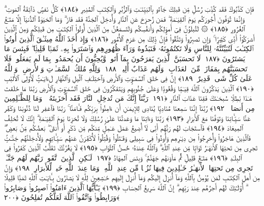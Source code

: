  فَإِن كَذَّبُوكَ فَقَد كُذِّبَ رُسُلٌۭ مِّن قَبلِكَ جَآءُو بِٱلبَيِّنَـٰتِ وَٱلزُّبُرِ وَٱلكِتَـٰبِ ٱلمُنِيرِ ﴿١٨٤﴾
 كُلُّ نَفسٍۢ ذَآئِقَةُ ٱلمَوتِ ۗ وَإِنَّمَا تُوَفَّونَ أُجُورَكُم يَومَ ٱلقِيَـٰمَةِ ۖ فَمَن زُحزِحَ عَنِ ٱلنَّارِ وَأُدخِلَ ٱلجَنَّةَ فَقَد فَازَ ۗ وَمَا ٱلحَيَوٰةُ ٱلدُّنيَآ إِلَّا مَتَـٰعُ ٱلغُرُورِ ﴿١٨٥﴾
 ۞ لَتُبلَوُنَّ فِىٓ أَموَٟلِكُم وَأَنفُسِكُم وَلَتَسمَعُنَّ مِنَ ٱلَّذِينَ أُوتُوا۟ ٱلكِتَـٰبَ مِن قَبلِكُم وَمِنَ ٱلَّذِينَ أَشرَكُوٓا۟ أَذًۭى كَثِيرًۭا ۚ وَإِن تَصبِرُوا۟ وَتَتَّقُوا۟ فَإِنَّ ذَٟلِكَ مِن عَزمِ ٱلأُمُورِ ﴿١٨٦﴾
 وَإِذ أَخَذَ ٱللَّهُ مِيثَـٰقَ ٱلَّذِينَ أُوتُوا۟ ٱلكِتَـٰبَ لَتُبَيِّنُنَّهُۥ لِلنَّاسِ وَلَا تَكتُمُونَهُۥ فَنَبَذُوهُ وَرَآءَ ظُهُورِهِم وَٱشتَرَوا۟ بِهِۦ ثَمَنًۭا قَلِيلًۭا ۖ فَبِئسَ مَا يَشتَرُونَ ﴿١٨٧﴾
 لَا تَحسَبَنَّ ٱلَّذِينَ يَفرَحُونَ بِمَآ أَتَوا۟ وَّيُحِبُّونَ أَن يُحمَدُوا۟ بِمَا لَم يَفعَلُوا۟ فَلَا تَحسَبَنَّهُم بِمَفَازَةٍۢ مِّنَ ٱلعَذَابِ ۖ وَلَهُم عَذَابٌ أَلِيمٌۭ ﴿١٨٨﴾
 وَلِلَّهِ مُلكُ ٱلسَّمَـٰوَٟتِ وَٱلأَرضِ ۗ وَٱللَّهُ عَلَىٰ كُلِّ شَىءٍۢ قَدِيرٌ ﴿١٨٩﴾
 إِنَّ فِى خَلقِ ٱلسَّمَـٰوَٟتِ وَٱلأَرضِ وَٱختِلَـٰفِ ٱلَّيلِ وَٱلنَّهَارِ لَءَايَـٰتٍۢ لِّأُو۟لِى ٱلأَلبَٰبِ ﴿١٩٠﴾
 ٱلَّذِينَ يَذكُرُونَ ٱللَّهَ قِيَـٰمًۭا وَقُعُودًۭا وَعَلَىٰ جُنُوبِهِم وَيَتَفَكَّرُونَ فِى خَلقِ ٱلسَّمَـٰوَٟتِ وَٱلأَرضِ رَبَّنَا مَا خَلَقتَ هَـٰذَا بَٰطِلًۭا سُبحَـٰنَكَ فَقِنَا عَذَابَ ٱلنَّارِ ﴿١٩١﴾
 رَبَّنَآ إِنَّكَ مَن تُدخِلِ ٱلنَّارَ فَقَد أَخزَيتَهُۥ ۖ وَمَا لِلظَّـٰلِمِينَ مِن أَنصَارٍۢ ﴿١٩٢﴾
 رَّبَّنَآ إِنَّنَا سَمِعنَا مُنَادِيًۭا يُنَادِى لِلإِيمَـٰنِ أَن ءَامِنُوا۟ بِرَبِّكُم فَـَٔامَنَّا ۚ رَبَّنَا فَٱغفِر لَنَا ذُنُوبَنَا وَكَفِّر عَنَّا سَيِّـَٔاتِنَا وَتَوَفَّنَا مَعَ ٱلأَبرَارِ ﴿١٩٣﴾
 رَبَّنَا وَءَاتِنَا مَا وَعَدتَّنَا عَلَىٰ رُسُلِكَ وَلَا تُخزِنَا يَومَ ٱلقِيَـٰمَةِ ۗ إِنَّكَ لَا تُخلِفُ ٱلمِيعَادَ ﴿١٩٤﴾
 فَٱستَجَابَ لَهُم رَبُّهُم أَنِّى لَآ أُضِيعُ عَمَلَ عَـٰمِلٍۢ مِّنكُم مِّن ذَكَرٍ أَو أُنثَىٰ ۖ بَعضُكُم مِّنۢ بَعضٍۢ ۖ فَٱلَّذِينَ هَاجَرُوا۟ وَأُخرِجُوا۟ مِن دِيَـٰرِهِم وَأُوذُوا۟ فِى سَبِيلِى وَقَـٰتَلُوا۟ وَقُتِلُوا۟ لَأُكَفِّرَنَّ عَنهُم سَيِّـَٔاتِهِم وَلَأُدخِلَنَّهُم جَنَّـٰتٍۢ تَجرِى مِن تَحتِهَا ٱلأَنهَـٰرُ ثَوَابًۭا مِّن عِندِ ٱللَّهِ ۗ وَٱللَّهُ عِندَهُۥ حُسنُ ٱلثَّوَابِ ﴿١٩٥﴾
 لَا يَغُرَّنَّكَ تَقَلُّبُ ٱلَّذِينَ كَفَرُوا۟ فِى ٱلبِلَـٰدِ ﴿١٩٦﴾
 مَتَـٰعٌۭ قَلِيلٌۭ ثُمَّ مَأوَىٰهُم جَهَنَّمُ ۚ وَبِئسَ ٱلمِهَادُ ﴿١٩٧﴾
 لَـٰكِنِ ٱلَّذِينَ ٱتَّقَوا۟ رَبَّهُم لَهُم جَنَّـٰتٌۭ تَجرِى مِن تَحتِهَا ٱلأَنهَـٰرُ خَـٰلِدِينَ فِيهَا نُزُلًۭا مِّن عِندِ ٱللَّهِ ۗ وَمَا عِندَ ٱللَّهِ خَيرٌۭ لِّلأَبرَارِ ﴿١٩٨﴾
 وَإِنَّ مِن أَهلِ ٱلكِتَـٰبِ لَمَن يُؤمِنُ بِٱللَّهِ وَمَآ أُنزِلَ إِلَيكُم وَمَآ أُنزِلَ إِلَيهِم خَـٰشِعِينَ لِلَّهِ لَا يَشتَرُونَ بِـَٔايَـٰتِ ٱللَّهِ ثَمَنًۭا قَلِيلًا ۗ أُو۟لَـٰٓئِكَ لَهُم أَجرُهُم عِندَ رَبِّهِم ۗ إِنَّ ٱللَّهَ سَرِيعُ ٱلحِسَابِ ﴿١٩٩﴾
 يَـٰٓأَيُّهَا ٱلَّذِينَ ءَامَنُوا۟ ٱصبِرُوا۟ وَصَابِرُوا۟ وَرَابِطُوا۟ وَٱتَّقُوا۟ ٱللَّهَ لَعَلَّكُم تُفلِحُونَ ﴿٢٠٠﴾
 

